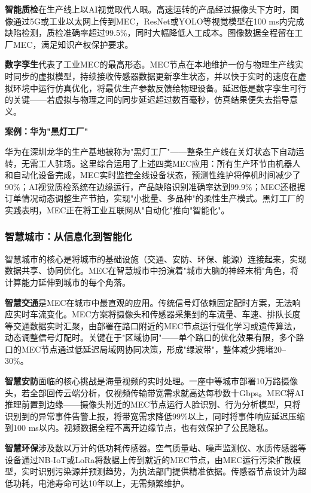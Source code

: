 \textbf{智能质检}在生产线上以AI视觉取代人眼。高速运转的产品经过摄像头下方时，图像通过5G或工业以太网上传到MEC，ResNet或YOLO等视觉模型在100 ms内完成缺陷检测，质检准确率超过99.5\%，同时大幅降低人工成本。图像数据全程留在工厂MEC，满足知识产权保护要求。

\textbf{数字孪生}代表了工业MEC的最高形态。MEC节点在本地维护一份与物理生产线实时同步的虚拟模型，持续接收传感器数据更新孪生状态，并以快于实时的速度在虚拟环境中运行仿真优化，将最优生产参数反馈给物理设备。延迟低是数字孪生可行的关键——若虚拟与物理之间的同步延迟超过数百毫秒，仿真结果便失去指导意义。

\textbf{案例：华为"黑灯工厂"}

华为在深圳龙华的生产基地被称为"黑灯工厂"——整条生产线在关灯状态下自动运转，无需工人驻场。这里综合运用了上述四类MEC应用：所有生产环节由机器人和自动化设备完成，MEC实时监控全线设备状态，预测性维护将停机时间减少了90\%；AI视觉质检系统在边缘运行，产品缺陷识别准确率达到99.9\%；MEC还根据订单情况动态调整生产节拍，实现"小批量、多品种"的柔性生产模式。黑灯工厂的实践表明，MEC正在将工业互联网从"自动化"推向"智能化"。

\subsubsection{智慧城市：从信息化到智能化}

智慧城市的核心是将城市的基础设施（交通、安防、环保、能源）连接起来，实现数据共享、协同优化。MEC在智慧城市中扮演着"城市大脑的神经末梢"角色，将计算能力延伸到城市的每个角落。

\textbf{智慧交通}是MEC在城市中最直观的应用。传统信号灯依赖固定配时方案，无法响应实时车流变化。MEC方案将摄像头和传感器采集到的车流量、车速、排队长度等交通数据实时汇聚，由部署在路口附近的MEC节点运行强化学习或遗传算法，动态调整信号灯配时。关键在于"区域协同"——单个路口的优化效果有限，多个路口的MEC节点通过低延迟局域网协同决策，形成"绿波带"，整体减少拥堵20--30\%。

\textbf{智慧安防}面临的核心挑战是海量视频的实时处理。一座中等城市部署10万路摄像头，若全部回传云端分析，仅视频传输带宽需求就高达每秒数十Gbps。MEC将AI推理前置到边缘——摄像头附近的MEC节点运行人脸识别、行为分析模型，只将识别到的异常事件告警上报，将带宽需求降低99\%以上，同时将事件响应延迟压缩到100 ms以内。视频数据全程不离开边缘节点，也有效保护了公民隐私。

\textbf{智慧环保}涉及数以万计的低功耗传感器。空气质量站、噪声监测仪、水质传感器等设备通过NB-IoT或LoRa将数据上传到就近的MEC节点，由MEC运行污染扩散模型，实时识别污染源并预测趋势，为执法部门提供精准依据。传感器节点设计为超低功耗，电池寿命可达10年以上，无需频繁维护。

